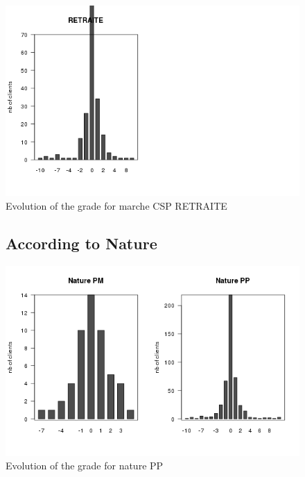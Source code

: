 \documentclass[a4paper, 11pt]{article}
\begin{document}
        \begin{figure}[!ht]
                \centering
                \includegraphics[height = 10 cm]{Remi/Evolution_of_the_grade_for_marche_CSP_RETRAITE.png}
                \caption{Evolution of the grade for marche CSP RETRAITE}
                \label{fig:e_CSP_RETRAITE}
        \end{figure}

        \begin{figure}[!ht]
				\subsection{According to Nature}
                \centering
                \includegraphics[height = 10 cm]{Remi/Evolution_of_the_grade_for_nature_PP.png}
                \caption{Evolution of the grade for nature PP}
                \label{fig:e_PP}
        \end{figure}
\end{document}
